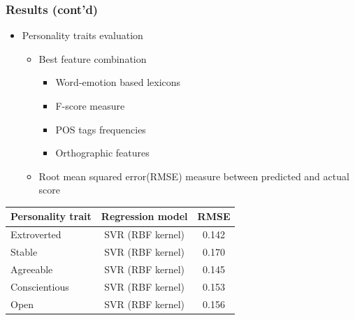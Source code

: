 \documentclass[slidestop,compress,11pt,xcolor=dvipsnames]{beamer}
\begin{document}
\begin{frame}[fragile] %
\frametitle{Results (cont'd)}
\begin{itemize}
	\item Personality traits evaluation
	\begin{itemize}
		\item Best feature combination
		\begin{itemize}
			\item Word-emotion based lexicons 
			\item F-score measure
			\item POS tags frequencies
			\item Orthographic features
			
		\end{itemize}
		\item Root mean squared error(RMSE) measure between predicted and actual score
	\end{itemize}
\end{itemize}
\begin{table}[h]
\vspace{-3mm}
\label{tab:narrow-table-4}
\begin{center}
\begin{tabular}{lcc}
\midrule
Personality trait & Regression model & RMSE\\
\midrule
 Extroverted & SVR  (RBF kernel) & 0.142 \\
 Stable & SVR (RBF kernel)& 0.170 \\
 Agreeable & SVR  (RBF kernel)& 0.145 \\
 Conscientious & SVR  (RBF kernel)  & 0.153 \\
 Open & SVR  (RBF kernel) & 0.156 \\
\bottomrule
\end{tabular}
\end{center}
\end{table}
\end{frame}
\end{document}
